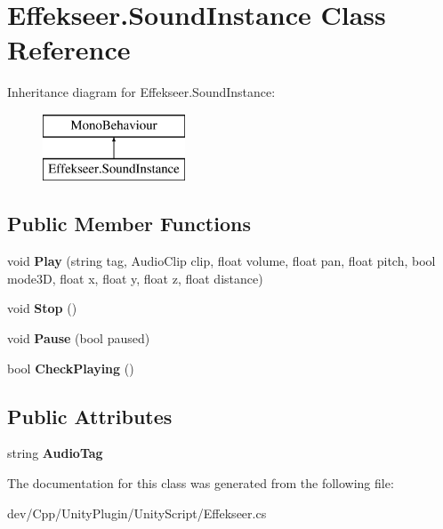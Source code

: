 \hypertarget{class_effekseer_1_1_sound_instance}{\section{Effekseer.\-Sound\-Instance Class Reference}
\label{class_effekseer_1_1_sound_instance}
}
Inheritance diagram for Effekseer.\-Sound\-Instance\-:\begin{figure}[H]
\begin{center}
\leavevmode
\includegraphics[height=2.000000cm]{class_effekseer_1_1_sound_instance}
\end{center}
\end{figure}
\subsection*{Public Member Functions}
\begin{DoxyCompactItemize}
\item 
\hypertarget{class_effekseer_1_1_sound_instance_a0dad13c99eec9f7fd3a254da889d41b0}{void {\bfseries Play} (string tag, Audio\-Clip clip, float volume, float pan, float pitch, bool mode3\-D, float x, float y, float z, float distance)}\label{class_effekseer_1_1_sound_instance_a0dad13c99eec9f7fd3a254da889d41b0}

\item 
\hypertarget{class_effekseer_1_1_sound_instance_a47120b96077ba0222ba7dcaac289947f}{void {\bfseries Stop} ()}\label{class_effekseer_1_1_sound_instance_a47120b96077ba0222ba7dcaac289947f}

\item 
\hypertarget{class_effekseer_1_1_sound_instance_a8bea651d2b06d9f9cf4cefc97a9f7226}{void {\bfseries Pause} (bool paused)}\label{class_effekseer_1_1_sound_instance_a8bea651d2b06d9f9cf4cefc97a9f7226}

\item 
\hypertarget{class_effekseer_1_1_sound_instance_aba66c6f052a23feff462c6ceebd09b2e}{bool {\bfseries Check\-Playing} ()}\label{class_effekseer_1_1_sound_instance_aba66c6f052a23feff462c6ceebd09b2e}

\end{DoxyCompactItemize}
\subsection*{Public Attributes}
\begin{DoxyCompactItemize}
\item 
\hypertarget{class_effekseer_1_1_sound_instance_aaecb9b470d568fa58a7b89d9b8374e65}{string {\bfseries Audio\-Tag}}\label{class_effekseer_1_1_sound_instance_aaecb9b470d568fa58a7b89d9b8374e65}

\end{DoxyCompactItemize}


The documentation for this class was generated from the following file\-:\begin{DoxyCompactItemize}
\item 
dev/\-Cpp/\-Unity\-Plugin/\-Unity\-Script/Effekseer.\-cs\end{DoxyCompactItemize}
